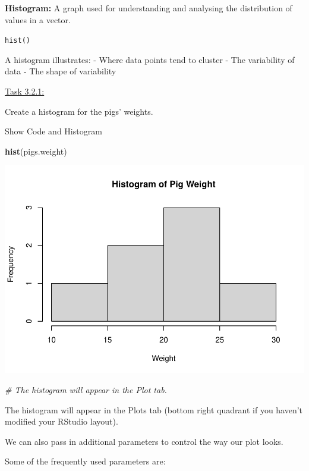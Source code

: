 \documentclass[
]{article}
\newenvironment{Shaded}{\begin{snugshade}}{\end{snugshade}}
\newcommand{\CommentTok}[1]{\textcolor[rgb]{0.56,0.35,0.01}{\textit{#1}}}
\newcommand{\FunctionTok}[1]{\textcolor[rgb]{0.13,0.29,0.53}{\textbf{#1}}}
\newcommand{\NormalTok}[1]{#1}
\begin{document}
\textbf{Histogram:} A graph used for understanding and analysing the
distribution of values in a vector.

\texttt{hist()}

A histogram illustrates: - Where data points tend to cluster - The
variability of data - The shape of variability

\ul{Task 3.2.1:}

Create a histogram for the pigs' weights.

Show Code and Histogram

\begin{Shaded}
\begin{Highlighting}[]
\FunctionTok{hist}\NormalTok{(pigs.weight)}
\end{Highlighting}
\end{Shaded}

\includegraphics{basics0_files/figure-latex/unnamed-chunk-20-1.pdf}

\begin{Shaded}
\begin{Highlighting}[]
\CommentTok{\# The histogram will appear in the Plot tab.}
\end{Highlighting}
\end{Shaded}

The histogram will appear in the Plots tab (bottom right quadrant if you
haven't modified your RStudio layout).

We can also pass in additional parameters to control the way our plot
looks.

Some of the frequently used parameters are:
\end{document}
